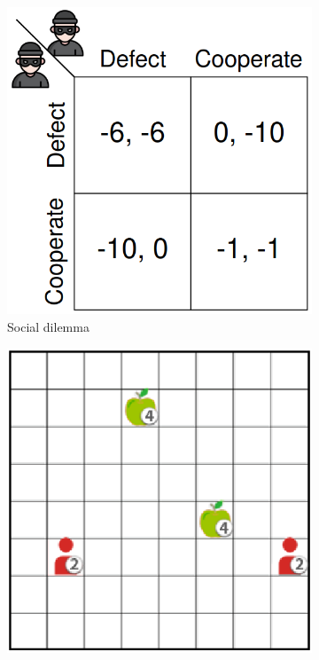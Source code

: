 \label{ChapterMADRL} 




\begin{figure}[h]
    \centering
    \begin{subfigure}[c]{0.24\textwidth}
        \centering
        \includegraphics[width=\textwidth]{Figures/MADRL/prisonersdilema.png}
        \caption{Social dilemma}
        \label{fig:prisoners}
    \end{subfigure}
    \hfill
    \begin{subfigure}[c]{0.23\textwidth}
        \centering
        \includegraphics[width=\textwidth]{Figures/MADRL/lbf.png}

\end{subfigure}
\end{figure}

